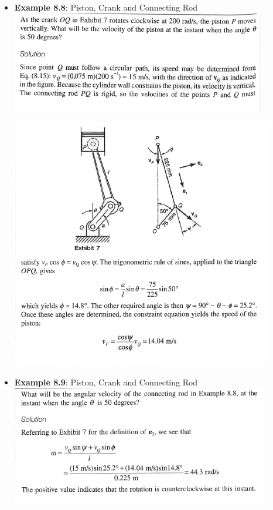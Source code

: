 \documentclass[11pt]{article}
\begin{document}
\begin{itemize}
	\item  \textbf{\Large Example 8.8}: Piston, Crank and Connecting Rod\\


\includegraphics[scale=1.2]{example_8_8.png}
	
\includegraphics[scale=1.2]{example_8_8b.png}
	
\newpage
	\item  \textbf{\Large Example 8.9}: Piston, Crank and Connecting Rod\\

\includegraphics[scale=1.2]{example_8_9.png}



\end{itemize}
\end{document}
